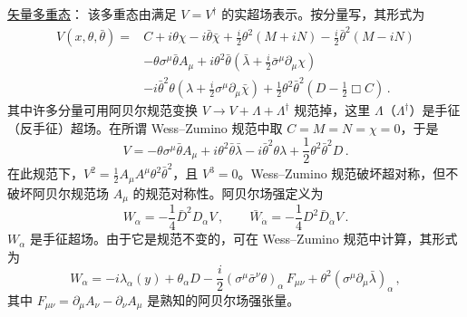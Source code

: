 
\noindent\underline{矢量多重态}：
\noindent 该多重态由满足 $V=V^\dagger$ 的实超场表示。按分量写，其形式为
$$
\begin{array}{lll}
V(x, \theta, \bar{\theta}) =& C + i \theta  \chi - i \bar{\theta}
\bar{\chi} + \frac{i}{2} \theta^{2} (M + i N) - \frac{i}{2}
\bar{\theta}^{2} (M - iN) \\
& - \theta \sigma^\mu \bar{\theta} A_\mu + i \theta^{2} \bar{\theta}
(\bar{\lambda} + \frac{i}{2} \bar{\sigma}^\mu \partial_\mu \chi )\\
& - i \bar{\theta}^{2} \theta (\lambda + \frac{i}{2} \sigma^\mu
\partial_\mu \bar{\chi} ) + \frac{1}{2} \theta^{2} \bar{\theta}^{2}
(D - \frac{1}{2} \Box C)\,.
\end{array}
$$
其中许多分量可用阿贝尔规范变换 $V \rightarrow V + \Lambda + \Lambda^\dagger$ 规范掉，这里
$\Lambda$（$\Lambda^\dagger$）是手征（反手征）超场。在所谓 Wess–Zumino 规范中取 $C=M=N=\chi= 0$，于是
$$
V=-\theta \sigma^\mu\bar{\theta}A_\mu+i\theta^{2}
\bar{\theta}\bar{\lambda} - i \bar{\theta}^{2} \theta \lambda +
\frac{1}{2} \theta^{2} \bar{\theta}^{2} D\,.
$$
在此规范下，$V^2=\frac{1}{2}A_\mu A^\mu \theta^{2}\bar{\theta}^{2}$，且 $V^{3}=0$。Wess–Zumino 规范破坏超对称，但不破坏阿贝尔规范场 $A_\mu$ 的规范对称性。阿贝尔场强定义为
$$
W_{\alpha} = - \frac{1}{4} \bar{D}^{2} D_{\alpha} V\,,\qquad
\bar{W}_{\dot{\alpha}}=-\frac{1}{4}D^{2} \bar{D}_{\dot{\alpha}}V\,.
$$
$W_{\alpha}$ 是手征超场。由于它是规范不变的，可在 Wess–Zumino 规范中计算，其形式为
\begin{equation}
W_\alpha =-i\lambda_\alpha (y)+\theta_\alpha D-\frac{i}{2} 
(\sigma^\mu\bar{\sigma}^\nu \theta)_\alpha \, F_{\mu\nu}+ 
\theta^2 (\sigma^\mu \partial_\mu \bar{\lambda} )_{\alpha}\,,
\label{W-abelian}
\end{equation}
其中 $F_{\mu\nu}=\partial_\mu A_\nu -\partial_\nu A_\mu$ 是熟知的阿贝尔场强张量。


